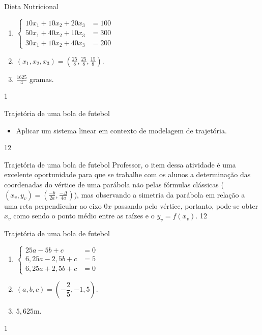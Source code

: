\clearmargin
\marginpar{\vspace{.5em}}
\begin{answer}{Dieta Nutricional}
{
\begin{enumerate}
\item 
$
\left \{
\begin{aligned}
10x_1+10x_2+20x_3&=100\\
50x_1+40x_2+10x_3&=300\\
30x_1+10x_2+40x_3&=200
\end{aligned}
\right.  
$
\item $\displaystyle(x_1,x_2,x_3)=(\frac{25}{8},\frac{25}{8},\frac{15}{8})$.
\item $\displaystyle\frac{1625}{4}$ gramas.
\end{enumerate}
}{1}
\end{answer}
\begin{objectives}{Trajetória de uma bola de futebol}
{
\begin{itemize}
\item Aplicar um sistema linear em contexto de modelagem de trajetória.
\end{itemize}
}{1}{2}
\end{objectives}
\begin{sugestions}{Trajetória de uma bola de futebol}
{
Professor, o item  dessa atividade é uma excelente oportunidade para que se trabalhe com os alunos a determinação das coordenadas do vértice de uma parábola não pelas fórmulas clássicas ($(x_v,y_v)=(\frac{-b}{2a}, \frac{-\Delta}{4a})$), mas observando a simetria da parábola em relação a uma reta perpendicular ao eixo $0x$ passando pelo vértice, portanto, pode-se obter $x_v$ como sendo o ponto médio entre as raízes e o $y_v=f(x_v)$. 
}{1}{2}
\end{sugestions}
\clearmargin
\begin{answer}{Trajetória de uma bola de futebol}
{
\begin{enumerate}
\item 
$
\left \{
\begin{aligned}
25a-5b+c&=0\\
6{,}25a-2{,}5b+c&=5\\
6{,}25a+2{,}5b+c&=0
\end{aligned}
\right.
$
\item $(a,b,c)=(-\dfrac{2}{5},-1,5)$.
\item $5{,}625$m.
\end{enumerate}
}{1}
\end{answer}


